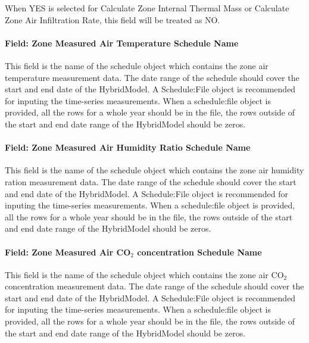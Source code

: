 When YES is selected for Calculate Zone Internal Thermal Mass or Calculate Zone Air Infiltration Rate, this field will be treated as NO.

\paragraph{Field: Zone Measured Air Temperature Schedule Name}\label{field-zone-measured-air-temperature-schedule-name-hm}

This field is the name of the schedule object which contains the zone air temperature measurement data. The date range of the schedule should cover the start and end date of the HybridModel. A Schedule:File object is recommended for inputing the time-series measurements. When a schedule:file object is provided, all the rows for a whole year should be in the file, the rows outside of the start and end date range of the HybridModel should be zeros.

\paragraph{Field: Zone Measured Air Humidity Ratio Schedule Name}\label{field-zone-measured-air-humidity-ratio-schedule-name-hm}

This field is the name of the schedule object which contains the zone air humidity ration measurement data. The date range of the schedule should cover the start and end date of the HybridModel. A Schedule:File object is recommended for inputing the time-series measurements. When a schedule:file object is provided, all the rows for a whole year should be in the file, the rows outside of the start and end date range of the HybridModel should be zeros.

\paragraph{Field: Zone Measured Air CO$_2$ concentration Schedule Name}\label{field-zone-measured-air-co2-concentration-schedule-name-hm}

This field is the name of the schedule object which contains the zone air CO$_2$ concentration measurement data. The date range of the schedule should cover the start and end date of the HybridModel. A Schedule:File object is recommended for inputing the time-series measurements. When a schedule:file object is provided, all the rows for a whole year should be in the file, the rows outside of the start and end date range of the HybridModel should be zeros.

